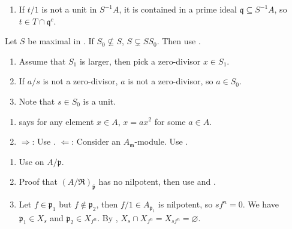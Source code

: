 \begin{exercise}\label{ex3.8}
	\begin{enumerate}
		\item[(v) $\Rightarrow$ (ii)] If $t/1$ is not a unit in $S^{-1}A$, it is contained in a prime ideal $\mathfrak{q}\subseteq S^{-1}A$, so $t\in T\cap\mathfrak{q}^c$.
	\end{enumerate}
\end{exercise}

\begin{exercise}\label{ex3.9}
	Let $S$ be maximal in . If $S_0\nsubseteq S$, $S\subsetneq SS_0$. Then use .
	\begin{enumerate}[label=(\roman*),ref=\theexercise(\roman*)]
		\item Assume that $S_1$ is larger, then pick a zero-divisor $x\in S_1$.
		\item If $a/s$ is not a zero-divisor, $a$ is not a zero-divisor, so $a\in S_0$.
		\item Note that $s\in S_0$ is a unit.
	\end{enumerate}
\end{exercise}

\begin{exercise}\label{ex3.10}
	\begin{enumerate}[label=(\roman*),ref=\theexercise(\roman*)]
		\item {} says for any element $x\in A$, $x=ax^2$ for some $a\in A$.
		\item $\Rightarrow$: Use . $\Leftarrow$: Consider an $A_\mathfrak{m}$-module. Use .
	\end{enumerate}
\end{exercise}

\begin{exercise}\label{ex3.11}
	\begin{enumerate}
		\item[(i) $\Rightarrow$ (ii)] Use  on $A/\mathfrak{p}$.
		\item[(ii) $\Rightarrow$ (i)] Proof that $\left(A/\mathfrak{R}\right)_{\overline{\mathfrak{p}}}$ has no nilpotent, then use  and .
		\item[(ii) $\Rightarrow$ (iv)] Let $f\in\mathfrak{p}_1$ but $f\notin\mathfrak{p}_2$, then $f/1\in A_{\mathfrak{p}_1}$ is nilpotent, so $sf^n=0$. We have $\mathfrak{p}_1\in X_s$ and $\mathfrak{p}_2\in X_{f^n}$. By , $X_s\cap X_{f^n}=X_{sf^n}=\varnothing$.
	\end{enumerate}
\end{exercise}

